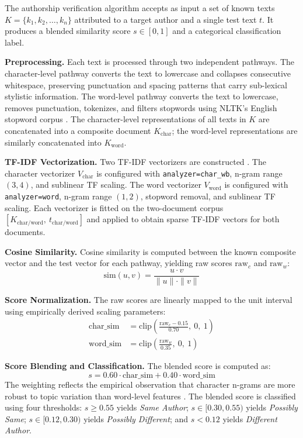 \documentclass[conference]{IEEEtran}
\begin{document}
The authorship verification algorithm accepts as input a set of known texts
$K = \{k_1, k_2, \ldots, k_n\}$ attributed to a target author and a single
test text $t$. It produces a blended similarity score $s \in [0, 1]$ and a
categorical classification label.

\textbf{Preprocessing.} Each text is processed through two independent
pathways. The character-level pathway converts the text to lowercase and
collapses consecutive whitespace, preserving punctuation and spacing patterns
that carry sub-lexical stylistic information. The word-level pathway converts
the text to lowercase, removes punctuation, tokenizes, and filters stopwords
using NLTK's English stopword corpus \cite{bird2009nltk}. The character-level
representations of all texts in $K$ are concatenated into a composite document
$K_{\text{char}}$; the word-level representations are similarly concatenated
into $K_{\text{word}}$.

\textbf{TF-IDF Vectorization.} Two TF-IDF vectorizers are constructed
\cite{salton1988tfidf}. The character vectorizer $V_{\text{char}}$ is
configured with \texttt{analyzer=char\_wb}, n-gram range $(3, 4)$, and
sublinear TF scaling. The word vectorizer $V_{\text{word}}$ is configured with
\texttt{analyzer=word}, n-gram range $(1, 2)$, stopword removal, and sublinear
TF scaling. Each vectorizer is fitted on the two-document corpus
$[K_{\text{char/word}},\ t_{\text{char/word}}]$ and applied to obtain sparse
TF-IDF vectors for both documents.

\textbf{Cosine Similarity.} Cosine similarity is computed between the known
composite vector and the test vector for each pathway, yielding raw scores
$\text{raw}_c$ and $\text{raw}_w$:
\begin{equation}
  \text{sim}(u, v) = \frac{u \cdot v}{\|u\| \cdot \|v\|}
\end{equation}

\textbf{Score Normalization.} The raw scores are linearly mapped to the unit
interval using empirically derived scaling parameters:
\begin{align}
  \text{char\_sim} &= \text{clip}\!\left(\frac{\text{raw}_c - 0.15}{0.70},\ 0,\ 1\right) \\
  \text{word\_sim} &= \text{clip}\!\left(\frac{\text{raw}_w}{0.35},\ 0,\ 1\right)
\end{align}

\textbf{Score Blending and Classification.} The blended score is computed as:
\begin{equation}
  s = 0.60 \cdot \text{char\_sim} + 0.40 \cdot \text{word\_sim}
\end{equation}
The weighting reflects the empirical observation that character n-grams are
more robust to topic variation than word-level features
\cite{stamatatos2009survey}. The blended score is classified using four
thresholds: $s \geq 0.55$ yields \textit{Same Author}; $s \in [0.30, 0.55)$
yields \textit{Possibly Same}; $s \in [0.12, 0.30)$ yields \textit{Possibly
Different}; and $s < 0.12$ yields \textit{Different Author}.
\end{document}
